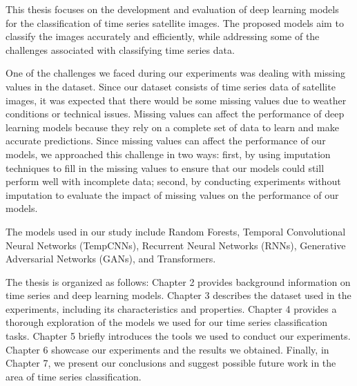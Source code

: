 This thesis focuses on the development and evaluation of deep learning models for the classification of time series satellite images.
The proposed models aim to classify the images accurately and efficiently, while addressing some of the challenges associated with classifying time series data.

One of the challenges we faced during our experiments was dealing with missing values in the dataset. 
Since our dataset consists of time series data of satellite images, it was expected that there would be some missing values due to weather conditions or technical issues.
Missing values can affect the performance of deep learning models because they rely on a complete set of data to learn and make accurate predictions.
Since missing values can affect the performance of our models, we approached this challenge in two ways: first, by using imputation techniques to fill in the missing values to ensure that our models could still perform well with incomplete data; second, by conducting experiments without imputation to evaluate the impact of missing values on the performance of our models.

The models used in our study include Random Forests, Temporal Convolutional Neural Networks (TempCNNs), Recurrent Neural Networks (RNNs), Generative Adversarial Networks (GANs), and Transformers.

The thesis is organized as follows: Chapter 2 provides background information on time series and deep learning models.
Chapter 3 describes the dataset used in the experiments, including its characteristics and properties.
Chapter 4 provides a thorough exploration of the models we used for our time series classification tasks.
Chapter 5 briefly introduces the tools we used to conduct our experiments.
Chapter 6 showcase our experiments and the results we obtained.
Finally, in Chapter 7, we present our conclusions and suggest possible future work in the area of time series classification.